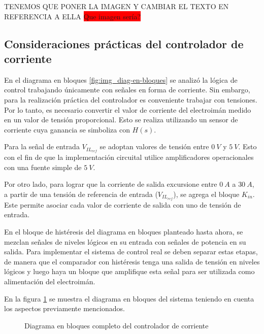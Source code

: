TENEMOS QUE PONER LA IMAGEN Y CAMBIAR EL TEXTO EN REFERENCIA A ELLA
\colorbox{red}{Que imagen sería?}

\subsection{Consideraciones prácticas del controlador de corriente}

En el diagrama en bloques \ref{fig:img_diag-en-bloques} se analizó la lógica de control trabajando únicamente con señales en forma de corriente. Sin embargo, para la realización práctica del controlador es conveniente trabajar con tensiones. Por lo tanto, es necesario  convertir el valor de corriente del electroimán medido en un valor de tensión proporcional. Esto se realiza utilizando un sensor de corriente cuya ganancia se simboliza con $H(s)$.

Para la señal de entrada $V_{IL_{ref}}$ se adoptan valores de tensión entre $0\:V$ y $5\:V$. Esto con el fin de que la implementación circuital utilice amplificadores operacionales con una fuente simple de $5\:V$. 

Por otro lado, para lograr que la corriente de salida excursione entre $0\:A$ a $30\:A$, a partir de una tensión de referencia de entrada ($V_{IL_{ref}}$), se agrega el bloque $K_{in}$. Este permite asociar cada valor de corriente de salida con uno de tensión de entrada.

En el bloque de histéresis del diagrama en bloques planteado hasta ahora, se mezclan señales de niveles lógicos en su entrada con señales de potencia en su salida. Para implementar el sistema de control real se deben separar estas etapas, de manera que el comparador con histéresis tenga una salida de tensión en niveles lógicos y luego haya un bloque que amplifique esta señal para ser utilizada como alimentación del electroimán.

En la figura \ref{fig:img_diag-en-bloques-conH-y-Kin} se muestra el diagrama en bloques del sistema teniendo en cuenta los aspectos previamente mencionados.


\begin{figure}[H]
	\centering
	
	\caption{Diagrama en bloques completo del controlador de corriente}	\label{fig:img_diag-en-bloques-conH-y-Kin}
\end{figure}

